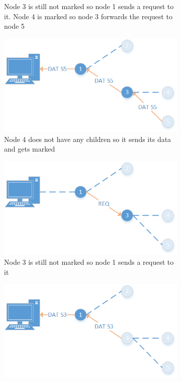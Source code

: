 \begin{figure}[htbp]
\begin{subfigure}[t]{0.4\textwidth}
        \caption{Node 3 is still not marked so node 1 sends a request to it. Node 4 is marked so node 3 forwards the request to node 5}
        \label{fig:link}
    \end{subfigure}
    \quad
    \quad
    \begin{subfigure}[t]{0.4\textwidth}
		\centering         
        \includegraphics[scale=0.6]{content/images/Collection/Part6}
        \caption{Node 4 does not have any children so it sends its data and gets marked}
        \label{fig:link}
    \end{subfigure}
    \quad
    \quad
    \begin{subfigure}[t]{0.4\textwidth}
		\centering         
        \includegraphics[scale=0.6]{content/images/Collection/Part7}
        \caption{Node 3 is still not marked so node 1 sends a request to it}
        \label{fig:link}
    \end{subfigure}
    \quad
    \quad
    \begin{subfigure}[t]{0.4\textwidth}
		\centering         
        \includegraphics[scale=0.6]{content/images/Collection/Part8}

\end{subfigure}
\end{figure}
